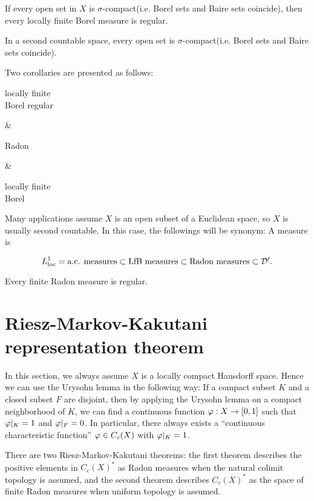 \documentclass{../exp}
\begin{document}
\begin{thm}
If every open set in $X$ is $\sigma$-compact(i.e. Borel sets and Baire sets coincide), then every locally finite Borel measure is regular.
\end{thm}
\begin{prop}
In a second countable space, every open set is $\sigma$-compact(i.e. Borel sets and Baire sets coincide).
\end{prop}


Two corollaries are presented as follows:
\begin{rd}[column sep={120pt,between origins}]
\parbox{7em}{\centering locally finite \\ Borel regular}  &
\parbox{5em}{\centering Radon}     &
\parbox{7em}{\centering locally finite \\ Borel}  
\end{rd}


Many applications assume $X$ is an open subset of a Euclidean space, so $X$ is usually second countable.
In this case, the followings will be synonym: A measure is
\begin{cond}
\item 
\end{cond}



\[L_{\text{loc}}^1=\text{a.c. measures}\subset\text{LfB measures}\subset\text{Radon measures}\subset\mathcal{D}'.\]


\begin{thm}
Every finite Radon measure is regular.
\end{thm}







\section{Riesz-Markov-Kakutani representation theorem}
In this section, we always assume $X$ is a locally compact Hausdorff space.
Hence we can use the Urysohn lemma in the following way: If a compact subset $K$ and a closed subset $F$ are disjoint, then by applying the Urysohn lemma on a compact neighborhood of $K$, we can find a continuous function $\f:X\to[0,1]$ such that $\varphi|_K=1$ and $\varphi|_F=0$.
In particular, there always exists a ``continuous characteristic function'' $\varphi\in C_c(X)$ with $\varphi|_K=1$.

There are two Riesz-Markov-Kakutani theorems: the first theorem describes the positive elements in $C_c(X)^*$ as Radon measures when the natural colimit topology is assumed, and the second theorem describes $C_c(X)^*$ as the space of finite Radon measures when uniform topology is assumed.
\end{document}

